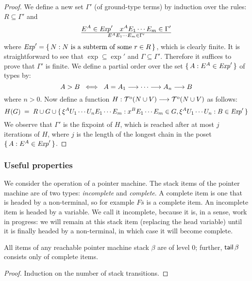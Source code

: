 \begin{proof}
We define a new set $\Gamma'$ (of ground-type terms) by induction over
the rules: $R \subseteq \Gamma'$ and
\[
{E^A \in \exp' \quad x^A E_1 \cdots E_m \in \Gamma'}\over{E^A E_1
\cdots E_m \in \Gamma'}
\]
where $\exp' = \makeset{ N : \hbox{$N$ is a subterm of some $r \in
R$}}$, which is clearly finite. It is straightforward to see that $\exp
\subseteq \exp'$ and $\Gamma \subseteq \Gamma'$. Therefore it suffices
to prove that $\Gamma'$ is finite. We define a partial order over the
set $\makeset{A : E^A \in \exp' }$ of types by:
\[
    A > B  \; \iff  \; A = A_1 \mor \cdots \mor A_n \mor B
\]
where $n > 0$. Now define a function $H : {\terms{o}{N \cup V}} \mor
\terms{o}{N \cup V}$ as follows:
\[
   H(G) \; = \; R \cup G \cup
      \makeset{ \xi^A U_1\cdots U_n E_1\cdots E_m :
              x^B E_1 \cdots E_m \in G,
              \xi^A U_1\cdots U_n : B \in \exp' }
\]
We observe that $\Gamma'$ is the fixpoint of $H$, which is reached
after at most $j$ iterations of $H$, where $j$ is the length of the
longest chain in the poset $\makeset{ A : E^A \in \exp' }$.
\end{proof}

\subsubsection*{Useful properties}
We consider the operation of a pointer machine. The stack items of
the pointer machine are of two types: \emph{incomplete} and
\emph{complete}. A complete item is one that is headed by a
non-terminal, so for example $F\overline{s}$ is a complete item.
An incomplete item is headed by a variable. We call it incomplete,
because it is, in a sense, work in progress: we will remain at
this stack item (replacing the head variable) until it is finally
headed by a non-terminal, in which case it will become complete.

\begin{lemma}\label{lem:complete}
All items of any reachable pointer machine stack $\beta$ are of
level 0; further, $\tail\beta$ consists only of complete items.
\end{lemma}

\begin{proof} Induction on the number of stack transitions.
\end{proof}

